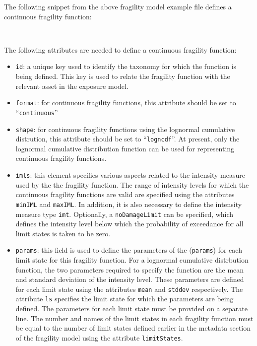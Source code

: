 The following snippet from the above fragility model example file defines a
continuous fragility function:

\inputminted[firstline=19,firstnumber=19,lastline=29,fontsize=\footnotesize,frame=single,linenos,bgcolor=lightgray]{xml}{oqum/risk/Verbatim/input_fragility.xml}\\

The following attributes are needed to define a continuous fragility function:

\begin{itemize}

    \item \Verb+id+: a unique key used to identify the \gls{taxonomy} for 
    which the function is being defined. This key is used to relate the 
    \gls{fragility function} with the relevant \gls{asset} in the 
    \gls{exposure model}.

    \item \Verb+format+: for continuous fragility functions, this attribute 
    should be set to ``\Verb+continuous+''

    \item \Verb+shape+: for continuous fragility functions using the lognormal
    cumulative distrution, this attribute should be set to ``\Verb+logncdf+''.
    At present, only the lognormal cumulative distribution function can be 
    used for representing continuous fragility functions.

    \item \Verb+imls+: this element specifies various aspects related to the 
    intensity measure used by the the \gls{fragility function}. The range of 
    intensity levels for which the continuous fragility functions are valid
    are specified using the attributes \Verb+minIML+ and \Verb+maxIML+. 
    In addition, it is also necessary to define the intensity measure type 
    \Verb+imt+. Optionally, a \Verb+noDamageLimit+ can be specified, which 
    defines the intensity level below which the probability of exceedance 
    for all limit states is taken to be zero.

    \item \Verb+params+: this field is used to define the parameters of 
    the (\Verb+params+) for each limit state for this 
    \gls{fragility function}. For a lognormal cumulative distrbution function, 
    the two parameters required to specify the function are the mean and 
    standard deviation of the intensity level. These parameters are defined for 
    each limit state using the attributes \Verb+mean+ and \Verb+stddev+ 
    respectively. The attribute \Verb+ls+ specifies the limit state for which 
    the parameters are being defined. The parameters for each limit state
    must be provided on a separate line. The number and names of the limit 
    states in each fragility function must be equal to the number of limit 
    states defined earlier in the metadata section of the \gls{fragility model}
    using the attribute \Verb+limitStates+.

\end{itemize}


